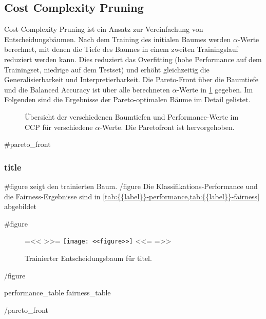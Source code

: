 \subsection{Cost Complexity Pruning}

Cost Complexity Pruning ist ein Ansatz zur Vereinfachung von
Entscheidungsbäumen. Nach dem Training des initialen Baumes
werden \(\alpha\)-Werte berechnet, mit denen die Tiefe des Baumes
in einem zweiten Trainingslauf reduziert werden kann. Dies reduziert
das Overfitting (hohe Performance auf dem Trainingset,
niedrige auf dem Testset) und erhöht gleichzeitig die
Generalisierbarkeit und Interpretierbarkeit.
Die Pareto-Front über die Baumtiefe und die Balanced Accuracy
ist über alle berechneten \(\alpha\)-Werte
in \cref{fig:{{label}}-pareto-tree} gegeben.
Im Folgenden sind die Ergebnisse der Pareto-optimalen Bäume im Detail
gelistet.

\begin{figure}[ht]
  \centering
  \caption{Übersicht der verschiedenen Baumtiefen und Performance-Werte
    im CCP für verschiedene \(\alpha\)-Werte. Die Paretofront ist
    hervorgehoben.}%
  \label{fig:{{label}}-pareto-tree}
\end{figure}

{{#pareto_front}}
\clearpage
\subsubsection{ {{title}} }
{{#figure}}
 zeigt den trainierten Baum.
{{/figure}}
Die Klassifikations-Performance und die Fairness-Ergebnisse sind in
\cref{tab:{{label}}-performance,tab:{{label}}-fairness}
abgebildet

{{#figure}}
\begin{figure}[ht]
  {{=<< >>=}}
  \texttt{[image: <<figure>>]}
  <<={{ }}=>>
  \caption{Trainierter Entscheidungsbaum für {{titel}}.}
  \label{fig:{{label}}-tree}
\end{figure}
{{/figure}}


{{{performance_table}}}
{{{fairness_table}}}

{{/pareto_front}}
